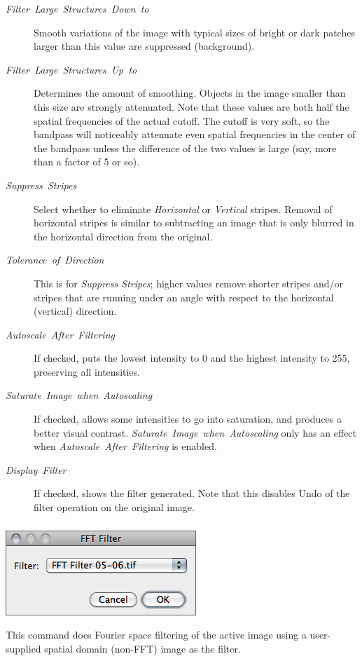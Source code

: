 \begin{description}
\item [{\emph{Filter\ Large\ Structures\ Down\ to}}] Smooth variations
of the image with typical sizes of bright or dark patches larger than
this value are suppressed (background).
\item [{\emph{Filter\ Large\ Structures\ Up\ to}}] Determines the amount
of smoothing. Objects in the image smaller than this size are strongly
attenuated. Note that these values are both half the spatial frequencies
of the actual cutoff. The cutoff is very soft, so the bandpass will
noticeably attenuate even spatial frequencies in the center of the
bandpass unless the difference of the two values is large (say, more
than a factor of 5 or so). 
\item [{\emph{Suppress}\ \emph{Stripes}}] Select whether to eliminate
\emph{Horizontal} or \emph{Vertical} stripes. Removal of horizontal
stripes is similar to subtracting an image that is only blurred in
the horizontal direction from the original. 
\item [{\emph{Tolerance\ of\ Direction}}] This is for \emph{Suppress
Stripes}; higher values remove shorter stripes and/or stripes that
are running under an angle with respect to the horizontal (vertical)
direction. 
\item [{\emph{Autoscale}\ \emph{After}\ \emph{Filtering}}] If checked,
puts the lowest intensity to 0 and the highest intensity to 255, preserving
all intensities.
\item [{\emph{Saturate}\ \emph{Image}\ \emph{when}\ \emph{Autoscaling}}] If
checked, allows some intensities to go into saturation, and produces
a better visual contrast. \emph{Saturate}\ \emph{Image}\ \emph{when}\ \emph{Autoscaling}
only has an effect when \emph{Autoscale}\ \emph{After}\ \emph{Filtering}
is enabled. 
\item [{\emph{Display\ Filter}}] If checked, shows the filter generated.
Note that this disables Undo of the filter operation on the original
image.
\end{description}

\subsubsection{\protect{}}

\begin{minipage}[c][1\totalheight][t]{0.39\columnwidth}%
\includegraphics[scale=0.55]{images/FFTcustomFilter}%
\end{minipage}%
\begin{minipage}[c][1\totalheight][t]{0.61\columnwidth}%
This command does Fourier space filtering of the active image using
a user-supplied spatial domain (non-FFT) image as the filter. %
\end{minipage}\\


